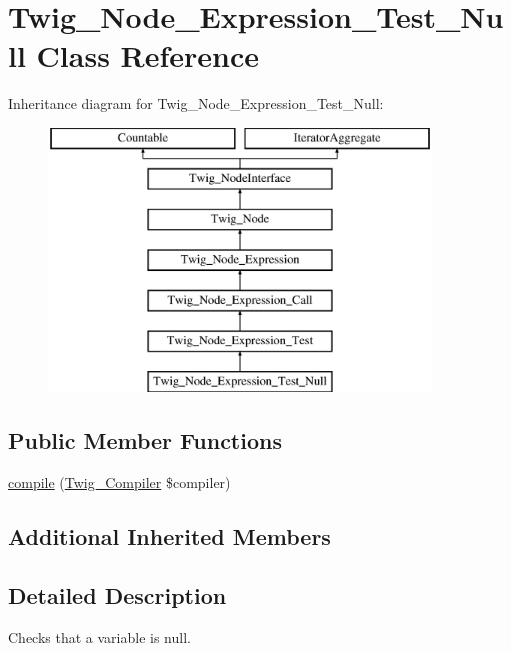 \hypertarget{class_twig___node___expression___test___null}{}\section{Twig\+\_\+\+Node\+\_\+\+Expression\+\_\+\+Test\+\_\+\+Null Class Reference}
\label{class_twig___node___expression___test___null}
Inheritance diagram for Twig\+\_\+\+Node\+\_\+\+Expression\+\_\+\+Test\+\_\+\+Null\+:\begin{figure}[H]
\begin{center}
\leavevmode
\includegraphics[height=7.000000cm]{class_twig___node___expression___test___null}
\end{center}
\end{figure}
\subsection*{Public Member Functions}
\begin{DoxyCompactItemize}
\item 
\hyperlink{class_twig___node___expression___test___null_a4e0faa87c3fae583620b84d3607085da}{compile} (\hyperlink{class_twig___compiler}{Twig\+\_\+\+Compiler} \$compiler)
\end{DoxyCompactItemize}
\subsection*{Additional Inherited Members}


\subsection{Detailed Description}
Checks that a variable is null.


